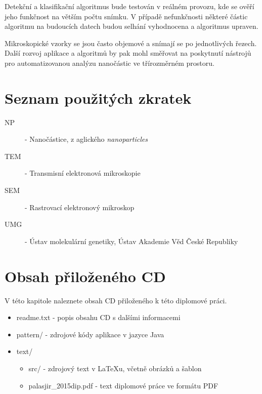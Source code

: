 \documentclass[11pt,twoside,a4paper,table]{book}
\begin{document}
Detekční a klasifikační algoritmus bude testován v reálném provozu, kde se ověří jeho funkčnost na větším počtu snímku. V případě nefunkčnosti některé částic algoritmu na budoucích datech budou selhání vyhodnocena a algoritmus upraven.

Mikroskopické vzorky se jsou často objemové a snímají se po jednotlivých řezech. Další rozvoj aplikace a algoritmů by pak mohl směřovat na poskytnutí nástrojů pro automatizovanou analýzu nanočástic ve třírozměrném prostoru.



{

}
\appendix


\chapter{Seznam použitých zkratek}

\begin{description}
\item[NP] - Nanočástice, z aglického \textit{nanoparticles}
\item[TEM] - Transmisní elektronová mikroskopie
\item[SEM] - Rastrovací elektronový mikroskop
\item[UMG] - Ústav molekulární genetiky, Ústav Akademie Věd České Republiky
\end{description}

\chapter{Obsah přiloženého CD}
V této kapitole naleznete obsah CD přiloženého k této diplomové práci.

\begin{itemize}
	\item readme.txt - popis obsahu CD s dalšími informacemi
	\item pattern/ - zdrojové kódy aplikace v jazyce Java
	\item text/
	\begin{itemize}
		\item src/ - zdrojový text v LaTeXu, včetně obrázků a šablon
		\item palasjir\_2015dip.pdf - text diplomové práce ve formátu PDF
	\end{itemize} 
\end{itemize}
\end{document}
